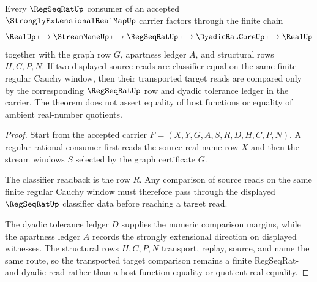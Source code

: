 \begin{theorem}
\label{thm:strongly-extensional-real-map-regseqrat-transport}
Every $\RegSeqRatUp$ consumer of an accepted $\StronglyExtensionalRealMapUp$ carrier factors through the finite chain
$$
\RealUp \longmapsto \StreamNameUp \longmapsto \RegSeqRatUp \longmapsto \DyadicRatCoreUp \longmapsto \RealUp
$$
together with the graph row $G$, apartness ledger $A$, and structural rows $H,C,P,N$. If two displayed source reads are classifier-equal on the same finite regular Cauchy window, then their transported target reads are compared only by the corresponding $\RegSeqRatUp$ row and dyadic tolerance ledger in the carrier. The theorem does not assert equality of host functions or equality of ambient real-number quotients.
\end{theorem}
\begin{proof}
Start from the accepted carrier $F=(X,Y,G,A,S,R,D,H,C,P,N)$. A regular-rational consumer first reads the source real-name row $X$ and then the stream windows $S$ selected by the graph certificate $G$.

The classifier readback is the row $R$. Any comparison of source reads on the same finite regular Cauchy window must therefore pass through the displayed $\RegSeqRatUp$ classifier data before reaching a target read.

The dyadic tolerance ledger $D$ supplies the numeric comparison margins, while the apartness ledger $A$ records the strongly extensional direction on displayed witnesses. The structural rows $H,C,P,N$ transport, replay, source, and name the same route, so the transported target comparison remains a finite RegSeqRat-and-dyadic read rather than a host-function equality or quotient-real equality.
\end{proof}


\begin{closurestatus}{\StronglyExtensionalRealMapUp}
  \theoryclosure{\seedClosure}
  \formalstatus{\unformalizedV}
\end{closurestatus}
